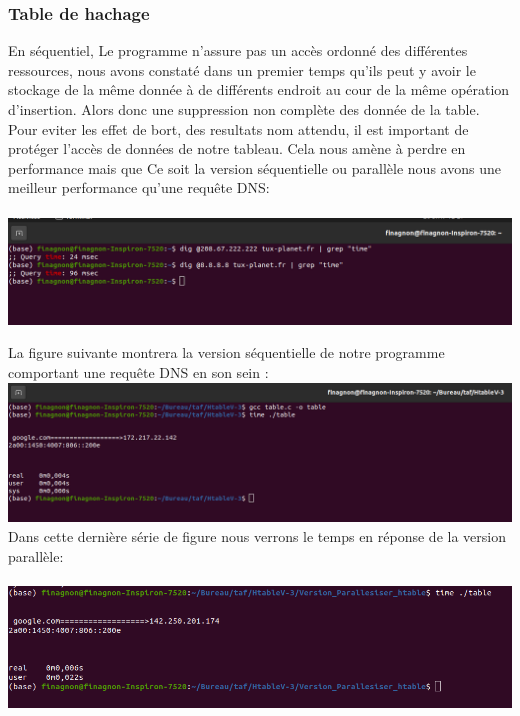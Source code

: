 \documentclass[12pt,a4paper]{article}
\begin{document}
\subsubsection{Table de hachage}
\quad En séquentiel, Le programme n'assure pas un accès ordonné des différentes ressources, nous avons constaté dans un premier temps qu'ils peut y avoir le stockage de la même donnée à de différents endroit au cour de la même opération d'insertion. Alors donc une suppression non complète des donnée de la table.
\qaud Pour eviter les effet de bort, des resultats nom attendu, il est important de protéger l'accès de données de notre tableau.
\qaud Cela nous amène à perdre en performance mais que Ce soit la version séquentielle ou parallèle nous avons une meilleur performance qu'une requête DNS:\\\\
\includegraphics[scale = 0.5]{figures/dig.png}

La figure suivante montrera la version séquentielle de notre programme comportant une requête DNS en son sein : \\
\includegraphics[scale = 0.5]{figures/sequent.png}
\\
Dans cette dernière série de figure nous verrons le temps en réponse de la version parallèle:\\\\
\includegraphics[scale = 0.5]{figures/paral.png}
\newpage
\end{document}
